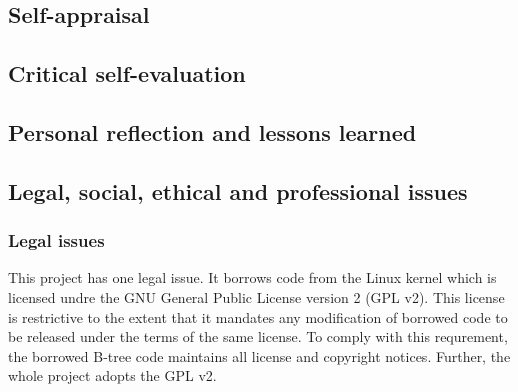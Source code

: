 \begin{appendices}

%
%
\chapter{Self-appraisal}


    \section{Critical self-evaluation}

    \section{Personal reflection and lessons learned}

    \section{Legal, social, ethical and professional issues}


        \subsection{Legal issues}
            \label{app:licence}

            This project has one legal issue. It borrows code from the Linux
            kernel which is licensed undre the GNU General Public License
            version 2 (GPL v2). This license is restrictive to the extent that
            it mandates any modification of borrowed code to be released under
            the terms of the same license. To comply with this requrement, the
            borrowed B-tree code maintains all license and copyright notices.
            Further, the whole project adopts the GPL v2.



\end{appendices}
